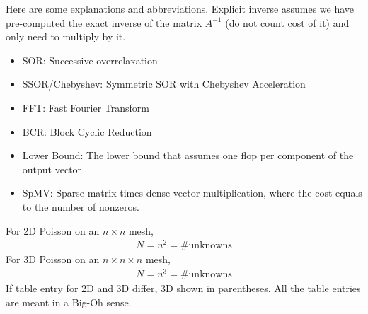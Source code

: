 \documentclass[11pt]{article}
\numberwithin{equation}{section}
\begin{document}
Here are some explanations and abbreviations. 
Explicit inverse assumes we have pre-computed the exact inverse of the matrix $A^{-1}$ (do not count cost of it) and only need to multiply by it.
\begin{itemize}
    \item SOR: Successive overrelaxation
    \item SSOR/Chebyshev: Symmetric SOR with Chebyshev Acceleration
    \item FFT: Fast Fourier Transform
    \item BCR: Block Cyclic Reduction
    \item Lower Bound: The lower bound that assumes one flop per component of the output vector
    \item SpMV: Sparse-matrix times dense-vector multiplication, where the cost equals to the number of nonzeros.
\end{itemize}
For 2D Poisson on an $n \times n$ mesh, \begin{align*}
    N = n^2 = \# \text{unknowns}
\end{align*}
For 3D Poisson on an $n \times n \times n$ mesh, \begin{align*}
    N = n^3 = \# \text{unknowns}
\end{align*}
If table entry for 2D and 3D differ, 3D shown in parentheses. All the table entries are meant in a Big-Oh sense.
\end{document}
